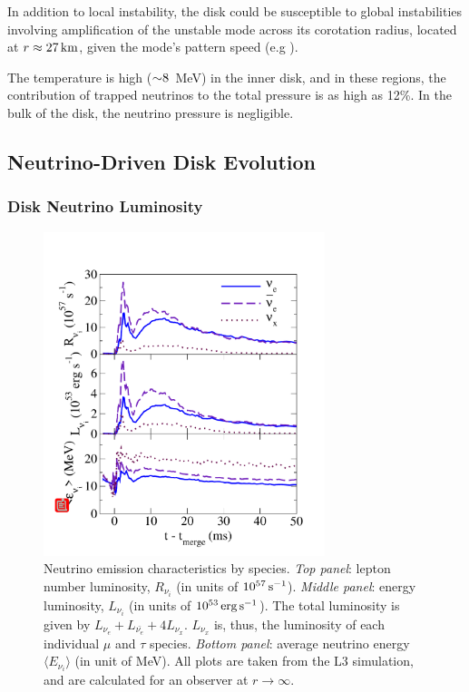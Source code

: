 In addition to local instability, the disk could be susceptible to global
instabilities involving amplification of the unstable mode across its corotation
radius, located at $r \approx 27\rm\,km$, given the mode's pattern
speed (e.g \citealt{papa1985-rot_stability}).

The temperature is high ($\mathord{\sim} 8$~MeV) in the inner disk, and in these
regions, the contribution of trapped neutrinos to the total pressure is as
high as 12\%.  In the bulk of the disk, the neutrino pressure is
negligible.

\subsection{Neutrino-Driven Disk Evolution}
\label{sec:neutrinodisk}

\subsubsection{Disk Neutrino Luminosity}

\begin{figure}
\includegraphics[width=8.2cm]{Figures/neutrinos_by_species}
\caption[Neutrinos emission by species]{
Neutrino emission characteristics by species.
{\em Top panel}: lepton number luminosity, $R_{\nu_i}$
(in units of $10^{57}\rm\,s^{-1}$).
{\em Middle panel}: energy luminosity, $L_{\nu_i}$
(in units of $10^{53}\rm\,erg\,s^{-1}$).
The total luminosity is given by $L_{\nu_e}+L_{\bar{\nu_e}}+4L_{\nu_x}$. 
$L_{\nu_x}$ is, thus, the luminosity of each individual $\mu$ and $\tau$
species.
{\em Bottom panel}: average neutrino energy $\langle E_{\nu_i} \rangle$
(in unit of MeV).
All plots are taken from the L3 simulation, and are calculated for
an observer at $r \rightarrow \infty$.
}
\label{fig:neutrinos_by_species}
\end{figure}

